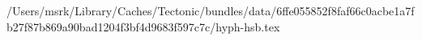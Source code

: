 /Users/msrk/Library/Caches/Tectonic/bundles/data/6ffe055852f8faf66c0acbe1a7fb27f87b869a90bad1204f3bf4d9683f597c7c/hyph-hsb.tex